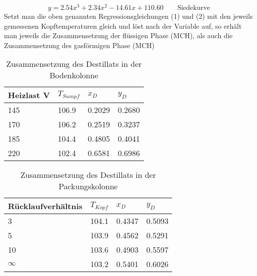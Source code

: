 \documentclass{article}
\begin{document}
\begin{equation}
y = 2.54 x ^ 3 + 2.34 x ^2 - 14.61 x + 110.60
\qquad \text{Siedekurve}
\end{equation}
Setzt man die oben genannten Regressionsgleichungen (1) und (2) mit den jeweils
gemessenen Kopftemperaturen gleich und löst nach der Variable auf, so erhält man jeweils
die Zusammensetzung der flüssigen Phase (MCH), als auch die Zusammensetzung des
gasförmigen Phase (MCH)
\begin{table}[ht!]
  \centering
 \begin{tabularx}{\textwidth}{XXXX}
Heizlast \si{\volt} & $T_{Sumpf}$ & $x_D$ & $y_D$  \\
\hline
\rowcolor{LightCyan}
145 & 106.9 & 0.2029 &  0.2680    \\
170 & 106.2 & 0.2519 &  0.3237 \\
\rowcolor{LightCyan}
185 & 104.4 & 0.4805 &  0.4041 \\
220 & 102.4 & 0.6581 &  0.6986 \\
\end{tabularx}
  \caption{Zusammensetzung des Destillats in der Bodenkolonne}
\end{table}

\begin{table}[ht!]
  \centering
 \begin{tabularx}{\textwidth}{XXXX}
Rücklaufverhältnis & $T_{Kopf}$ & $x_D$ & $y_D$  \\
\hline
\rowcolor{LightCyan}
3         & 104.1  &  0.4347 & 0.5093   \\
5         & 103.9  &  0.4562 & 0.5291   \\
\rowcolor{LightCyan}
10        & 103.6  &  0.4903 & 0.5597   \\
$\infty$  & 103.2  &  0.5401 & 0.6026  \\
\end{tabularx}
  \caption{Zusammensetzung des Destillats in der Packungskolonne}
\end{table}
\end{document}
